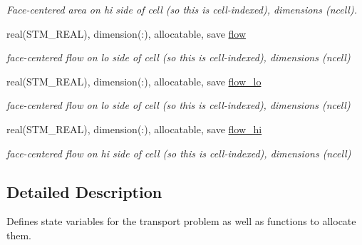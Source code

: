\begin{CompactItemize}
\begin{CompactList}\small\item\em Face-centered area on hi side of cell (so this is cell-indexed), dimensions (ncell). \item\end{CompactList}\item 
\hypertarget{a00037_88dd57ded46fa6673f667161ee540ce0}{
real(STM\_\-REAL), dimension(:), allocatable, save \hyperlink{a00037_88dd57ded46fa6673f667161ee540ce0}{flow}}
\label{a00037_88dd57ded46fa6673f667161ee540ce0}

\begin{CompactList}\small\item\em face-centered flow on lo side of cell (so this is cell-indexed), dimensions (ncell) \item\end{CompactList}\item 
\hypertarget{a00037_2a18ed6d204661d7aa6803779011c87c}{
real(STM\_\-REAL), dimension(:), allocatable, save \hyperlink{a00037_2a18ed6d204661d7aa6803779011c87c}{flow\_\-lo}}
\label{a00037_2a18ed6d204661d7aa6803779011c87c}

\begin{CompactList}\small\item\em face-centered flow on lo side of cell (so this is cell-indexed), dimensions (ncell) \item\end{CompactList}\item 
\hypertarget{a00037_bc7a2b101d2156c4a5770e105d945297}{
real(STM\_\-REAL), dimension(:), allocatable, save \hyperlink{a00037_bc7a2b101d2156c4a5770e105d945297}{flow\_\-hi}}
\label{a00037_bc7a2b101d2156c4a5770e105d945297}

\begin{CompactList}\small\item\em face-centered flow on hi side of cell (so this is cell-indexed), dimensions (ncell) \item\end{CompactList}\end{CompactItemize}


\subsection{Detailed Description}
Defines state variables for the transport problem as well as functions to allocate them. 



